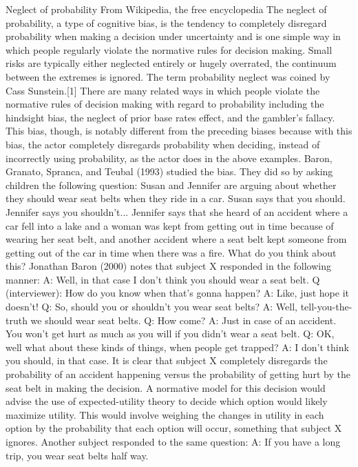 Neglect of probability
From Wikipedia, the free encyclopedia
The neglect of probability, a type of cognitive bias, is the tendency to completely disregard probability when making a decision under uncertainty and is one simple way in which people regularly violate the normative rules for decision making. Small risks are typically either neglected entirely or hugely overrated, the continuum between the extremes is ignored. The term probability neglect was coined by Cass Sunstein.[1]
There are many related ways in which people violate the normative rules of decision making with regard to probability including the hindsight bias, the neglect of prior base rates effect, and the gambler's fallacy. This bias, though, is notably different from the preceding biases because with this bias, the actor completely disregards probability when deciding, instead of incorrectly using probability, as the actor does in the above examples.
Baron, Granato, Spranca, and Teubal (1993) studied the bias. They did so by asking children the following question:
Susan and Jennifer are arguing about whether they should wear seat belts when they ride in a car. Susan says that you should. Jennifer says you shouldn't... Jennifer says that she heard of an accident where a car fell into a lake and a woman was kept from getting out in time because of wearing her seat belt, and another accident where a seat belt kept someone from getting out of the car in time when there was a fire. What do you think about this?
Jonathan Baron (2000) notes that subject X responded in the following manner:
A: Well, in that case I don't think you should wear a seat belt.
Q (interviewer): How do you know when that's gonna happen?
A: Like, just hope it doesn't!
Q: So, should you or shouldn't you wear seat belts?
A: Well, tell-you-the-truth we should wear seat belts.
Q: How come?
A: Just in case of an accident. You won't get hurt as much as you will if you didn't wear a seat belt.
Q: OK, well what about these kinds of things, when people get trapped?
A: I don't think you should, in that case.
It is clear that subject X completely disregards the probability of an accident happening versus the probability of getting hurt by the seat belt in making the decision. A normative model for this decision would advise the use of expected-utility theory to decide which option would likely maximize utility. This would involve weighing the changes in utility in each option by the probability that each option will occur, something that subject X ignores.
Another subject responded to the same question:
A: If you have a long trip, you wear seat belts half way.
